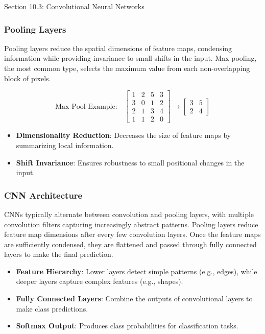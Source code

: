 \begin{notes}{Section 10.3: Convolutional Neural Networks}
    \subsubsection*{Pooling Layers}
    
    Pooling layers reduce the spatial dimensions of feature maps, condensing information while providing invariance to small shifts in the input. Max pooling, the most common type, selects the maximum value 
    from each non-overlapping block of pixels.
    
    \[
    \text{Max Pool Example:}
    \quad
    \begin{bmatrix}
        1 & 2 & 5 & 3 \\
        3 & 0 & 1 & 2 \\
        2 & 1 & 3 & 4 \\
        1 & 1 & 2 & 0
    \end{bmatrix}
    \to
    \begin{bmatrix}
        3 & 5 \\
        2 & 4
    \end{bmatrix}
    \]
    
    \begin{highlight}
        \begin{itemize}
            \item \textbf{Dimensionality Reduction}: Decreases the size of feature maps by summarizing local information.
            \item \textbf{Shift Invariance}: Ensures robustness to small positional changes in the input.
        \end{itemize}
    \end{highlight}
    
    \subsubsection*{CNN Architecture}
    
    CNNs typically alternate between convolution and pooling layers, with multiple convolution filters capturing increasingly abstract patterns. Pooling layers reduce feature map dimensions after every few 
    convolution layers. Once the feature maps are sufficiently condensed, they are flattened and passed through fully connected layers to make the final prediction.
    
    \begin{highlight}
        \begin{itemize}
            \item \textbf{Feature Hierarchy}: Lower layers detect simple patterns (e.g., edges), while deeper layers capture complex features (e.g., shapes).
            \item \textbf{Fully Connected Layers}: Combine the outputs of convolutional layers to make class predictions.
            \item \textbf{Softmax Output}: Produces class probabilities for classification tasks.
        \end{itemize}
    \end{highlight}
    

\end{notes}
